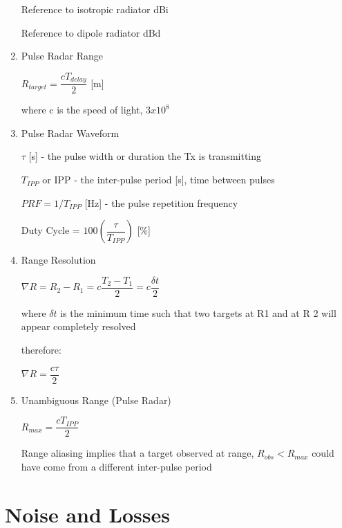 \documentclass[10pt]{article}
\renewcommand{\frac}{\dfrac}
\begin{document}
\begin{enumerate}
Reference to isotropic radiator dBi

Reference to dipole radiator dBd

\item Pulse Radar Range

	\centerline{$R_{target} = \frac{c T_{delay}}{2}$ [m]} 
	
	where c is the speed of light, $3x10^8$
	
	
\item Pulse Radar Waveform

	$\tau$ [s] - the pulse width or duration the Tx is transmitting
	
	$T_{IPP}$ or IPP - the inter-pulse period [s], time between pulses
	
	$PRF = 1/T_{IPP}$ [Hz]  - the pulse repetition frequency
	
	Duty Cycle = $100(\frac{\tau}{T_{IPP}})$ [\%]
	
	
\item Range Resolution
	
	\centerline{$\nabla R = R_2 - R_1 = c\frac{T_2 - T_1}{2} = c\frac{\delta t}{2}$}
	
	where $\delta t$ is the minimum time such that two targets at R1 and at R 2
	will appear completely resolved

	therefore:

	\centerline{$\nabla R = \frac{c\tau}{2}$}
	
\item Unambiguous Range (Pulse Radar)

	\centerline{$R_{max} = \frac{c T_{IPP}}{2}$}
	
	Range aliasing implies that a target observed at range, $R_{obs} < R_{max}$
could have come from a different inter-pulse period
	
\end{enumerate}

\section*{Noise and Losses}
\end{document}

